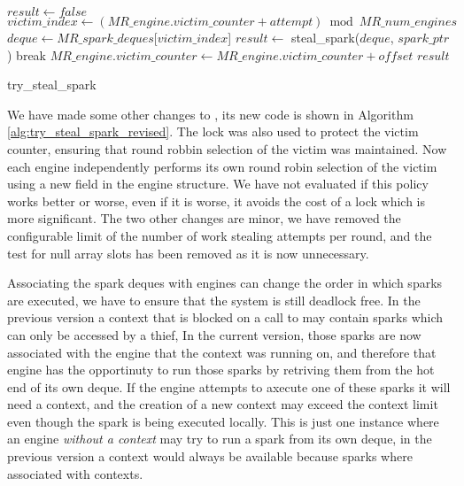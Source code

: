 \begin{algorithm}
\begin{algorithmic}[1]
  \State $result \gets false$
    \State $victim\_index \gets
        (MR\_engine.victim\_counter + attempt) \bmod MR\_num\_engines$
    \State $deque \gets
       MR\_spark\_deques$[$victim\_index$]
    \State $result \gets$ steal\_spark($deque$, $spark\_ptr$)
      \State break
    \EndIf
  \EndFor
  \State $MR\_engine.victim\_counter \gets
    MR\_engine.victim\_counter + offset$
  \State \Return $result$
\EndProcedure
\end{algorithmic}
\caption{try\_steal\_spark}
\label{alg:try_steal_spark_revised}
\end{algorithm}

We have made some other changes to \trystealspark,
its new code is shown in Algorithm \ref{alg:try_steal_spark_revised}.
The lock was also used to protect the victim counter,
ensuring that round robbin selection of the victim was maintained.
Now each engine independently performs its own round robin selection of the
victim using a new field  in the engine structure.
We have not evaluated if this policy works better or worse,
even if it is worse,
it avoids the cost of a lock which is more significant.
The two other changes are minor,
we have removed the configurable limit of the number of work stealing
attempts per round,
and the test for null array slots has been removed as it is now unnecessary.

Associating the spark deques with engines can change the order in which
sparks are executed,
we have to ensure that the system is still deadlock free.
In the previous version
a context that is blocked on a call to \wait may contain sparks
which can only be accessed by a thief,
In the current version,
those sparks are now associated with the engine that the context was running
on,
and therefore that engine has the opportinuty to run those sparks by
retriving them from the hot end of its own deque.
If the engine attempts to axecute one of these sparks it will need a
context,
and the creation of a new context may exceed the context limit even though
the spark is being executed locally.
This is just one instance where an engine \emph{without a context}
may try to run a spark from its own deque,
in the previous version a context would always be available because sparks
where associated with contexts.

